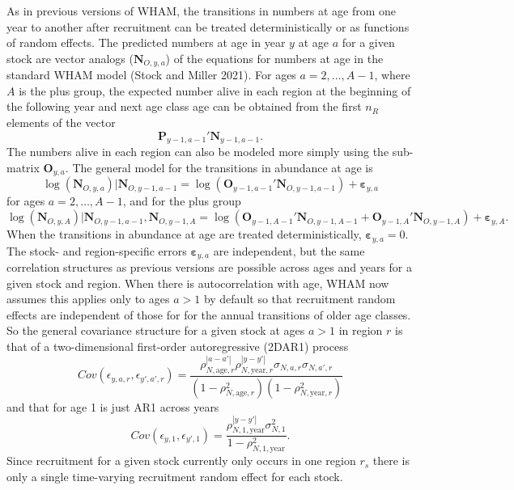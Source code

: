 \documentclass[
]{article}
\begin{document}
As in previous versions of WHAM, the transitions in numbers at age from
one year to another after recruitment can be treated deterministically
or as functions of random effects. The predicted numbers at age in year
\(y\) at age \(a\) for a given stock are vector analogs
(\(\mathbf{N}_{O,y,a}\)) of the equations for numbers at age in the
standard WHAM model (Stock and Miller 2021). For ages
\(a = 2,\ldots, A-1\), where \(A\) is the plus group, the expected
number alive in each region at the beginning of the following year and
next age class age can be obtained from the first \(n_R\) elements of
the vector \[\mathbf{P}_{y-1,a-1}' \mathbf{N}_{y-1,a-1}.\] The numbers
alive in each region can also be modeled more simply using the
sub-matrix \(\mathbf{O}_{y,a}\). The general model for the transitions
in abundance at age is \begin{equation*}
\log\left(\mathbf{N}_{O,y,a}\right)|\mathbf{N}_{O,y-1,a-1} =  \log\left(\mathbf{O}_{y-1,a-1}' \mathbf{N}_{O,y-1,a-1}\right) + \boldsymbol{\varepsilon}_{y,a}
\end{equation*} for ages \(a = 2,\ldots, A-1\), and for the plus group
\begin{equation*}
\log\left(\mathbf{N}_{O,y,A}\right)|\mathbf{N}_{O,y-1,a-1},\mathbf{N}_{O,y-1,A} = \log\left(\mathbf{O}_{y-1,A-1}' \mathbf{N}_{O,y-1,A-1} + \mathbf{O}_{y-1,A}' \mathbf{N}_{O,y-1,A}\right) + \boldsymbol{\varepsilon}_{y,A}.
\end{equation*} When the transitions in abundance at age are treated
deterministically, \(\boldsymbol{\varepsilon}_{y,a} = 0\). The stock-
and region-specific errors \(\boldsymbol{\varepsilon}_{y,a}\) are
independent, but the same correlation structures as previous versions
are possible across ages and years for a given stock and region. When
there is autocorrelation with age, WHAM now assumes this applies only to
ages \(a>1\) by default so that recruitment random effects are
independent of those for for the annual transitions of older age
classes. So the general covariance structure for a given stock at ages
\(a>1\) in region \(r\) is that of a two-dimensional first-order
autoregressive (2DAR1) process \begin{equation*}
  Cov\left(\epsilon_{y,a,r},\epsilon_{y',a',r}\right) =   \frac{\rho_{N,\text{age},r}^{|a-a'|}\rho_{N,\text{year},r}^{|y-y'|}\sigma_{N,a,r}\sigma_{N,a',r}}{\left(1 -  \rho_{N,\text{age},r}^2\right)\left(1 - \rho_{N,\text{year},r}^2\right)} 
\end{equation*} and that for age 1 is just AR1 across years
\begin{equation*}
  Cov\left(\epsilon_{y,1},\epsilon_{y',1}\right) =   \frac{\rho_{N,1,\text{year}}^{|y-y'|}\sigma^2_{N,1}}{1 - \rho_{N,1,\text{year}}^2}.
\end{equation*} Since recruitment for a given stock currently only
occurs in one region \(r_s\) there is only a single time-varying
recruitment random effect for each stock.
\end{document}
